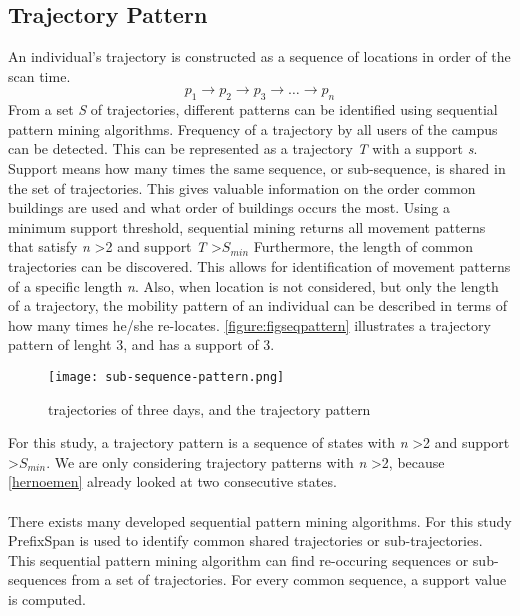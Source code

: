 \subsection{Trajectory Pattern}
An individual’s trajectory is constructed as a sequence of locations in order of the scan time. 
$$p_{1} \rightarrow p_{2} \rightarrow p_{3} \rightarrow …\rightarrow p_{n}$$
From a set \textit{S} of trajectories, different patterns can be identified using sequential pattern mining algorithms. Frequency of a trajectory by all users of the campus can be detected. This can be represented as a trajectory \textit{T} with a support \textit{s}. Support means how many times the same sequence, or sub-sequence, is shared in the set of trajectories. This gives valuable information on the order common buildings are used and what order of buildings occurs the most. Using a minimum support threshold, sequential mining returns all movement patterns that satisfy \textit{n} \textgreater 2 and support \textit{T} \textgreater \textit{$S_{min}$}   Furthermore, the length of common trajectories can be discovered. This allows for identification of movement patterns of a specific length \textit{n}. Also, when location is not considered, but only the length of a trajectory, the mobility pattern of an individual can be described in terms of how many times he/she re-locates. \autoref{figure:figseqpattern} illustrates a trajectory pattern of lenght 3, and has a support of 3.

\begin{figure}[H]
\centering
\texttt{[image: sub-sequence-pattern.png]}
\captionsetup{justification=centering}
\caption{trajectories of three days, and the trajectory pattern}
\label{figure:figseqpattern}
\end{figure}
For this study, a trajectory pattern is a sequence of states with \textit{n} \textgreater 2 and support \textgreater \textit{$S_{min}$}. We are only considering trajectory patterns with \textit{n} \textgreater 2, because \autoref{hernoemen} already looked at two consecutive states.\\\\
There exists many developed sequential pattern mining algorithms. For this study PrefixSpan \cite{pei2004mining} is used to identify common shared trajectories or sub-trajectories. This sequential pattern mining algorithm can find re-occuring sequences or sub-sequences from a set of trajectories. For every common sequence, a support value is computed. 
